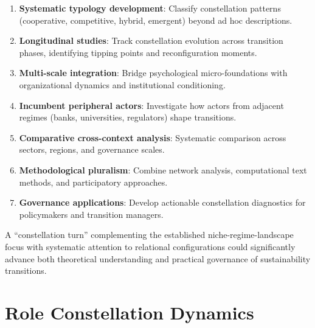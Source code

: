 \documentclass[11pt,a4paper]{article}
\begin{document}
\begin{enumerate}[noitemsep,topsep=0pt]
    \item \textbf{Systematic typology development}: Classify constellation patterns (cooperative, competitive, hybrid, emergent) beyond ad hoc descriptions.
    \item \textbf{Longitudinal studies}: Track constellation evolution across transition phases, identifying tipping points and reconfiguration moments.
    \item \textbf{Multi-scale integration}: Bridge psychological micro-foundations with organizational dynamics and institutional conditioning.
    \item \textbf{Incumbent peripheral actors}: Investigate how actors from adjacent regimes (banks, universities, regulators) shape transitions.
    \item \textbf{Comparative cross-context analysis}: Systematic comparison across sectors, regions, and governance scales.
    \item \textbf{Methodological pluralism}: Combine network analysis, computational text methods, and participatory approaches.
    \item \textbf{Governance applications}: Develop actionable constellation diagnostics for policymakers and transition managers.
\end{enumerate}

A ``constellation turn'' complementing the established niche-regime-landscape focus with systematic attention to relational configurations could significantly advance both theoretical understanding and practical governance of sustainability transitions.

\section{Role Constellation Dynamics}
\end{document}
